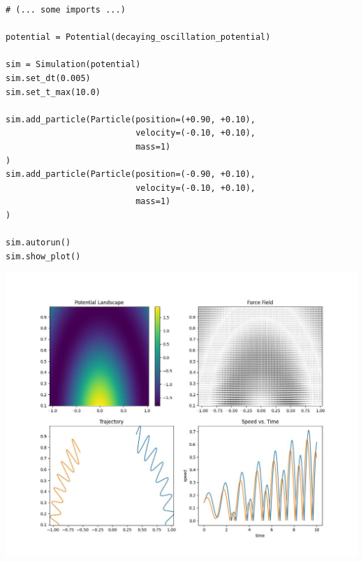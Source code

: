 
\begin{frame}[fragile]
%
\begin{codebox}[main.py]
\begin{verbatim}
# (... some imports ...)

potential = Potential(decaying_oscillation_potential)

sim = Simulation(potential)
sim.set_dt(0.005)
sim.set_t_max(10.0)

sim.add_particle(Particle(position=(+0.90, +0.10),
                          velocity=(-0.10, +0.10),
                          mass=1)
)
sim.add_particle(Particle(position=(-0.90, +0.10),
                          velocity=(-0.10, +0.10),
                          mass=1)
)

sim.autorun()
sim.show_plot()
\end{verbatim}
\end{codebox}
%
\end{frame}


\begin{frame}
%
\vspace{-4pt}
\begin{center}
\includegraphics[width=.78\linewidth]{./gfx/01-result}
\end{center}
%
\end{frame}